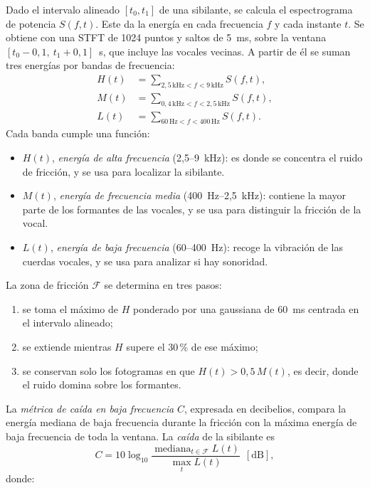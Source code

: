 \documentclass[conference]{IEEEtran}
\begin{document}
Dado el intervalo alineado $[t_0,t_1]$ de una sibilante, se calcula el espectrograma de potencia $S(f,t)$. Este da la energía en cada frecuencia $f$ y cada instante $t$. Se obtiene con una STFT de 1024 puntos y saltos de 5~ms, sobre la ventana $[t_0-0{,}1,\ t_1+0{,}1]$~s, que incluye las vocales vecinas. A partir de él se suman tres energías por bandas de frecuencia:
\begin{align}
H(t) &= \textstyle\sum_{2{,}5\,\mathrm{kHz}<f<9\,\mathrm{kHz}} S(f,t), \\
M(t) &= \textstyle\sum_{0{,}4\,\mathrm{kHz}<f<2{,}5\,\mathrm{kHz}} S(f,t), \\
L(t) &= \textstyle\sum_{60\,\mathrm{Hz}<f<400\,\mathrm{Hz}} S(f,t).
\end{align}
Cada banda cumple una función:
\begin{itemize}
\item $H(t)$, \emph{energía de alta frecuencia} (2,5--9~kHz): es donde se concentra el ruido de fricción, y se usa para localizar la sibilante.
\item $M(t)$, \emph{energía de frecuencia media} (400~Hz--2,5~kHz): contiene la mayor parte de los formantes de las vocales, y se usa para distinguir la fricción de la vocal.
\item $L(t)$, \emph{energía de baja frecuencia} (60--400~Hz): recoge la vibración de las cuerdas vocales, y se usa para analizar si hay sonoridad.
\end{itemize}
La zona de fricción $\mathcal{F}$ se determina en tres pasos:
\begin{enumerate}
\item se toma el máximo de $H$ ponderado por una gaussiana de 60~ms centrada en el intervalo alineado;
\item se extiende mientras $H$ supere el 30\,\% de ese máximo;
\item se conservan solo los fotogramas en que $H(t)>0{,}5\,M(t)$, es decir, donde el ruido domina sobre los formantes.
\end{enumerate}
La \emph{métrica de caída en baja frecuencia} $C$, expresada en decibelios, compara la energía mediana de baja frecuencia durante la fricción con la máxima energía de baja frecuencia de toda la ventana. La \emph{caída} de la sibilante es
\begin{equation}
C = 10\log_{10}\frac{\operatorname{mediana}_{t\in\mathcal{F}} L(t)}{\max_t L(t)}\ \ [\mathrm{dB}],
\end{equation}
donde:
\end{document}
